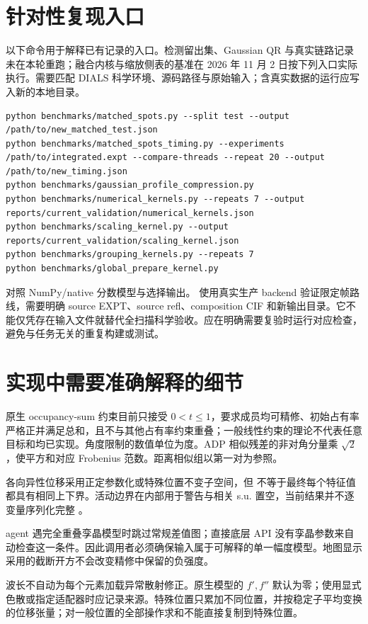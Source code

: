 \section{针对性复现入口}
以下命令用于解释已有记录的入口。检测留出集、Gaussian QR 与真实链路记录未在本轮重跑；融合内核与缩放侧表的基准在 2026 年 11 月 2 日按下列入口实际执行。需要匹配 DIALS 科学环境、源码路径与原始输入；含真实数据的运行应写入新的本地目录。
\begin{lstlisting}
python benchmarks/matched_spots.py --split test --output /path/to/new_matched_test.json
python benchmarks/matched_spots_timing.py --experiments /path/to/integrated.expt --compare-threads --repeat 20 --output /path/to/new_timing.json
python benchmarks/gaussian_profile_compression.py
python benchmarks/numerical_kernels.py --repeats 7 --output reports/current_validation/numerical_kernels.json
python benchmarks/scaling_kernel.py --output reports/current_validation/scaling_kernel.json
python benchmarks/grouping_kernels.py --repeats 7
python benchmarks/global_prepare_kernel.py
\end{lstlisting}
 对照 NumPy/native 分数模型与选择输出。 使用真实生产 backend 验证限定帧路线，需要明确 source EXPT、source refl、composition CIF 和新输出目录。它不能仅凭存在输入文件就替代全扫描科学验收。应在明确需要复验时运行对应检查，避免与任务无关的重复构建或测试。
\section{实现中需要准确解释的细节}
原生 occupancy-sum 约束目前只接受 $0<t\le1$，要求成员均可精修、初始占有率严格正并满足总和，且不与其他占有率约束重叠；一般线性约束的理论不代表任意目标和均已实现。角度限制的数值单位为度。ADP 相似残差的非对角分量乘 $\sqrt2$，使平方和对应 Frobenius 范数。距离相似组以第一对为参照。

各向异性位移采用正定参数化或特殊位置不变子空间，但  不等于最终每个特征值都具有相同上下界。活动边界在内部用于警告与相关 s.u. 置空，当前结果并不逐变量序列化完整 。

agent 遇完全重叠孪晶模型时跳过常规差值图；直接底层  API 没有孪晶参数来自动检查这一条件。因此调用者必须确保输入属于可解释的单一幅度模型。地图显示采用的截断开方不会改变精修中保留的负强度。

波长不自动为每个元素加载异常散射修正。原生模型的 $f',f''$ 默认为零；使用显式色散或指定适配器时应记录来源。特殊位置只累加不同位置，并按稳定子平均变换的位移张量；对一般位置的全部操作求和不能直接复制到特殊位置。

